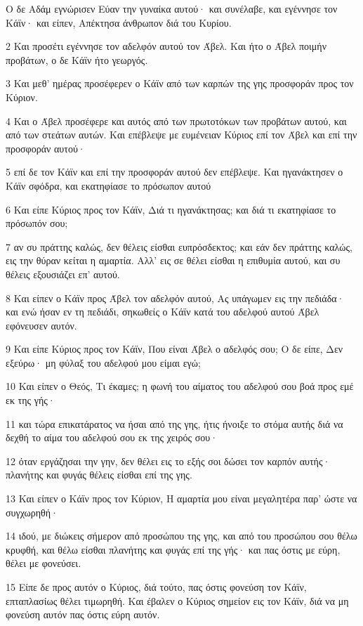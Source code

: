 \par Ο δε Αδάμ εγνώρισεν Εύαν την γυναίκα αυτού· και συνέλαβε, και εγέννησε τον Κάϊν· και είπεν, Απέκτησα άνθρωπον διά του Κυρίου.
\par 2 Και προσέτι εγέννησε τον αδελφόν αυτού τον Άβελ. Και ήτο ο Άβελ ποιμήν προβάτων, ο δε Κάϊν ήτο γεωργός.
\par 3 Και μεθ' ημέρας προσέφερεν ο Κάϊν από των καρπών της γης προσφοράν προς τον Κύριον.
\par 4 Και ο Άβελ προσέφερε και αυτός από των πρωτοτόκων των προβάτων αυτού, και από των στεάτων αυτών. Και επέβλεψε με ευμένειαν Κύριος επί τον Άβελ και επί την προσφοράν αυτού·
\par 5 επί δε τον Κάϊν και επί την προσφοράν αυτού δεν επέβλεψε. Και ηγανάκτησεν ο Κάϊν σφόδρα, και εκατηφίασε το πρόσωπον αυτού
\par 6 Και είπε Κύριος προς τον Κάϊν, Διά τι ηγανάκτησας; και διά τι εκατηφίασε το πρόσωπόν σου;
\par 7 αν συ πράττης καλώς, δεν θέλεις είσθαι ευπρόσδεκτος; και εάν δεν πράττης καλώς, εις την θύραν κείται η αμαρτία. Αλλ' εις σε θέλει είσθαι η επιθυμία αυτού, και συ θέλεις εξουσιάζει επ' αυτού.
\par 8 Και είπεν ο Κάϊν προς Άβελ τον αδελφόν αυτού, Ας υπάγωμεν εις την πεδιάδα· και ενώ ήσαν εν τη πεδιάδι, σηκωθείς ο Κάϊν κατά του αδελφού αυτού Άβελ εφόνευσεν αυτόν.
\par 9 Και είπε Κύριος προς τον Κάϊν, Που είναι Άβελ ο αδελφός σου; Ο δε είπε, Δεν εξεύρω· μη φύλαξ του αδελφού μου είμαι εγώ;
\par 10 Και είπεν ο Θεός, Τι έκαμες; η φωνή του αίματος του αδελφού σου βοά προς εμέ εκ της γής·
\par 11 και τώρα επικατάρατος να ήσαι από της γης, ήτις ήνοιξε το στόμα αυτής διά να δεχθή το αίμα του αδελφού σου εκ της χειρός σου·
\par 12 όταν εργάζησαι την γην, δεν θέλει εις το εξής σοι δώσει τον καρπόν αυτής· πλανήτης και φυγάς θέλεις είσθαι επί της γης.
\par 13 Και είπεν ο Κάϊν προς τον Κύριον, Η αμαρτία μου είναι μεγαλητέρα παρ' ώστε να συγχωρηθή·
\par 14 ιδού, με διώκεις σήμερον από προσώπου της γης, και από του προσώπου σου θέλω κρυφθή, και θέλω είσθαι πλανήτης και φυγάς επί της γής· και πας όστις με εύρη, θέλει με φονεύσει.
\par 15 Είπε δε προς αυτόν ο Κύριος, διά τούτο, πας όστις φονεύση τον Κάϊν, επταπλασίως θέλει τιμωρηθή. Και έβαλεν ο Κύριος σημείον εις τον Κάϊν, διά να μη φονεύση αυτόν πας όστις εύρη αυτόν.

